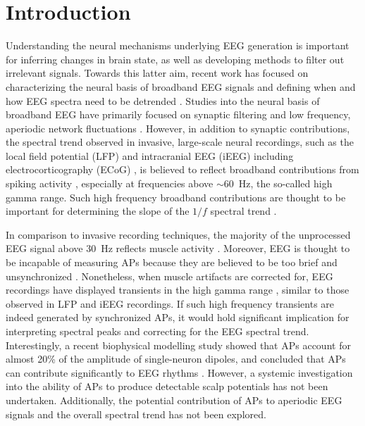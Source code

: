 \section{Introduction}
Understanding the neural mechanisms underlying EEG generation is important for inferring changes in brain state, as well as developing methods to filter out irrelevant signals. Towards this latter aim, recent work has focused on characterizing the neural basis of broadband EEG signals and defining when and how EEG spectra need to be detrended \cite{Donoghue2020, Gerster2022, Brake2024}. Studies into the neural basis of broadband EEG have primarily focused on synaptic filtering \cite{Brake2024,Gao2017,Miller2009,Bedard2006} and low frequency, aperiodic network fluctuations \cite{Brake2024, Chaudhuri2018, Lombardi2017}. However, in addition to synaptic contributions, the spectral trend observed in invasive, large-scale neural recordings, such as the local field potential (LFP) \cite{Ray2008, Ray2011, Kayser2003} and intracranial EEG (iEEG) \cite{Vidal2010, Lachaux2005} including electrocorticography (ECoG) \cite{Podvalny2015, Miller2007, Canolty2006, Crone2006}, is believed to reflect broadband contributions from spiking activity \cite{Ray2008, Ray2011, Manning2009}, especially at frequencies above ${\sim}60$~\unit{\hertz}, the so-called high gamma range. Such high frequency broadband contributions are thought to be important for determining the slope of the $1/f$ spectral trend \cite{Gao2016}.

In comparison to invasive recording techniques, the majority of the unprocessed EEG signal above 30~\unit{\hertz} reflects muscle activity \cite{Whitham2007, Whitham2008, Fitzgibbon2013, Muthukumaraswamy2013}. Moreover, EEG is thought to be incapable of measuring APs because they are believed to be too brief and unsynchronized \cite{Nunez2006, Buzsaki2012}. Nonetheless, when muscle artifacts are corrected for, EEG recordings have displayed transients in the high gamma range \cite{Onton2009, Volker2018, Seeber2015}, similar to those observed in LFP and iEEG recordings. If such high frequency transients are indeed generated by synchronized APs, it would hold significant implication for interpreting spectral peaks and correcting for the EEG spectral trend. Interestingly, a recent biophysical modelling study showed that APs account for almost 20\% of the amplitude of single-neuron dipoles, and concluded that APs can contribute significantly to EEG rhythms \cite{Thio2023}. However, a systemic investigation into the ability of APs to produce detectable scalp potentials has not been undertaken. Additionally, the potential contribution of APs to aperiodic EEG signals and the overall spectral trend has not been explored.

